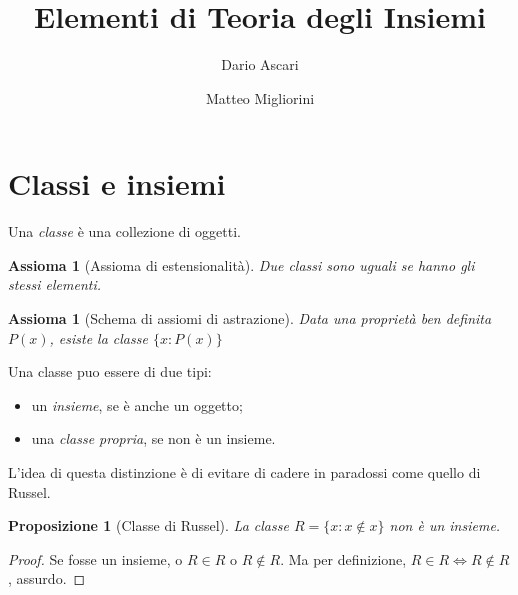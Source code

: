\documentclass[a4paper,10pt,oneside]{article}
\title{Elementi di Teoria degli Insiemi}
\author{Dario Ascari \and Matteo Migliorini}
\date{}
\newcommand{\myname}[1]{\emph{#1}}
\newcommand{\nin}{\not\in}
\theoremstyle{plain}
\newtheorem{myprop}[mytheorem]{Proposizione}
\newtheorem{myax}[mytheorem]{Assioma}
\theoremstyle{definition}
\theoremstyle{remark}
\begin{document}
\maketitle

\cleardoublepage


\cleardoublepage

\tableofcontents
\cleardoublepage




\section{Classi e insiemi}

Una \myname{classe} è una collezione di oggetti. 

\begin{myax}[Assioma di estensionalità]
 Due classi sono uguali se hanno gli stessi elementi.
\end{myax}
\begin{myax}[Schema di assiomi di astrazione]
 Data una proprietà ben definita $P(x)$, esiste la classe $\{x: P(x)\}$
\end{myax}

Una classe puo essere di due tipi:

\begin{itemize}
 \item un \myname{insieme}, se è anche un oggetto;
 \item una \myname{classe propria}, se non è un insieme.
\end{itemize}

L'idea di questa distinzione è di evitare di cadere in paradossi come quello di Russel.
\begin{myprop}[Classe di Russel]
  La classe $R=\{x:x\not \in x\}$ non è un insieme.
\end{myprop}
\begin{proof}
 Se fosse un insieme, o $R\in R$ o $R \nin R$. Ma per definizione, $R\in R \Leftrightarrow R \nin R$, assurdo.
\end{proof}
\end{document}
